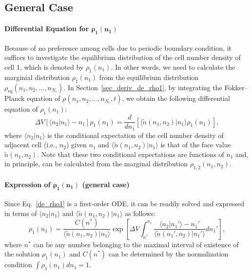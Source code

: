 \documentclass{article}
\newcommand{\dV}{{\Delta V}}
\newcommand{\Nc}{{N_\mathrm{c}}}
\begin{document}
\subsection{\label{subsec_main_res_gen}General Case}

\paragraph{Differential Equation for $\bm{\rho_1(n_1)}$}

Because of no preference among cells due to periodic boundary condition, it suffices to investigate the equilibrium distribution of the cell number density of cell 1, which is denoted by $\rho_1(n_1)$.
In other words, we need to calculate the marginial distribution $\rho_1(n_1)$ from the equilibrium distribution $\rho_\mathrm{eq}(n_1,n_2,\dots,n_\Nc)$.
In Section~\ref{sec_deriv_de_rho1}, by integrating the Fokker--Planck equation of $\rho(n_1,n_2,\dots,n_\Nc,t)$, we obtain the following differential equation of $\rho_1(n_1)$:
\begin{equation}
\label{de_rho1}
\dV\left[\langle n_2|n_1\rangle-n_1\right]\rho_1(n_1)=\frac{d}{d n_1}\left[\langle\tilde{n}(n_1,n_2)|n_1\rangle\rho_1(n_1)\right],
\end{equation}
where $\langle n_2|n_1\rangle$ is the conditional expectation of the cell number density of adjacent cell (i.e., $n_2$) given $n_1$ and $\langle\tilde{n}(n_1,n_2)|n_1\rangle$ is that of the face value $\tilde{n}(n_1,n_2)$.
Note that these two conditional expectations are functions of $n_1$ and, in principle, can be calculated from the marginal distribution $\rho_{1,2}(n_1,n_2)$.

\paragraph{Expression of $\bm{\rho_1(n_1)}$ (general case)}

Since Eq.~\eqref{de_rho1} is a first-order ODE, it can be readily solved and expressed in terms of $\langle n_2|n_1\rangle$ and $\langle\tilde{n}(n_1,n_2)|n_1\rangle$ as follows:
\begin{equation}
\label{expr_rho1_gen}
\rho_1(n_1)=\frac{C(n^*)}{\langle\tilde{n}(n_1,n_2)|n_1\rangle}\exp\left[\dV\int_{n^*}^{n_1} \frac{\langle n_2|n_1'\rangle-n_1'}{\langle\tilde{n}(n_1',n_2)|n_1'\rangle}dn_1'\right],
\end{equation}
where $n^*$ can be any number belonging to the maximal interval of existence of the solution $\rho_1(n_1)$ and $C(n^*)$ can be determined by the normalization condition $\int \rho_1(n_1)dn_1=1$.
\end{document}
